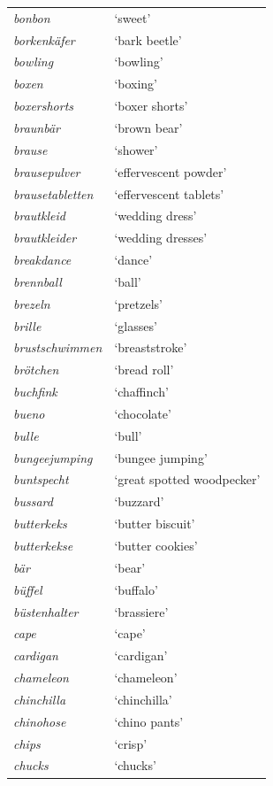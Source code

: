 \begin{longtable}{ll}
\textit{bonbon} & `sweet' \\
\textit{borkenkäfer} & `bark beetle' \\
\textit{bowling} & `bowling' \\
\textit{boxen} & `boxing' \\
\textit{boxershorts} & `boxer shorts' \\
\textit{braunbär} & `brown bear' \\
\textit{brause} & `shower' \\
\textit{brausepulver} & `effervescent powder' \\
\textit{brausetabletten} & `effervescent tablets' \\
\textit{brautkleid} & `wedding dress' \\
\textit{brautkleider} & `wedding dresses' \\
\textit{breakdance} & `dance' \\
\textit{brennball} & `ball' \\
\textit{brezeln} & `pretzels' \\
\textit{brille} & `glasses' \\
\textit{brustschwimmen} & `breaststroke' \\
\textit{brötchen} & `bread roll' \\
\textit{buchfink} & `chaffinch' \\
\textit{bueno} & `chocolate' \\
\textit{bulle} & `bull' \\
\textit{bungeejumping} & `bungee jumping' \\
\textit{buntspecht} & `great spotted woodpecker' \\
\textit{bussard} & `buzzard' \\
\textit{butterkeks} & `butter biscuit' \\
\textit{butterkekse} & `butter cookies' \\
\textit{bär} & `bear' \\
\textit{büffel} & `buffalo' \\
\textit{büstenhalter} & `brassiere' \\
\textit{cape} & `cape' \\
\textit{cardigan} & `cardigan' \\
\textit{chameleon} & `chameleon' \\
\textit{chinchilla} & `chinchilla' \\
\textit{chinohose} & `chino pants' \\
\textit{chips} & `crisp' \\
\textit{chucks} & `chucks' \\

\end{longtable}
